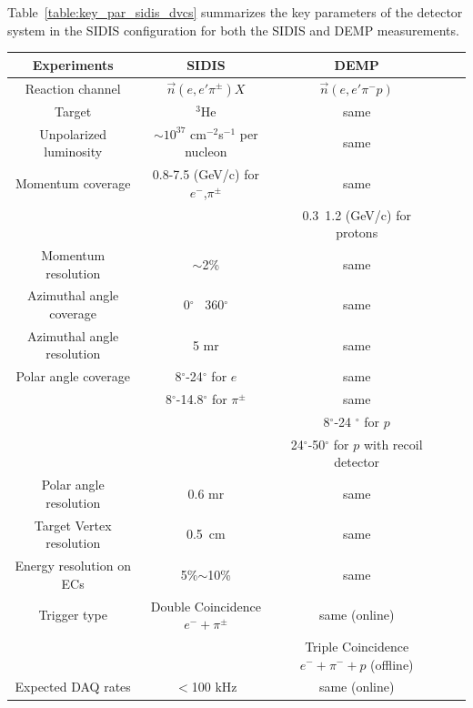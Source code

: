 Table~\ref{table:key_par_sidis_dvcs} summarizes the key parameters of the
detector system in the SIDIS configuration for both the SIDIS and DEMP
measurements.
\begin{table}\centering
\begin{tabular}{|c|c|c|c|c|}
\hline
Experiments                & SIDIS                    & DEMP  \\\hline
Reaction channel           & $\vec{n}(e,e'\pi^{\pm})X$ & $\vec{n}(e,e'\pi^{-}p)$	\\\hline
Target                     & $^3$He                   &same 	\\\hline
Unpolarized luminosity     & $\sim10^{37}$ cm$^{-2}$s$^{-1}$ per nucleon & same	\\\hline 
Momentum coverage          & 0.8-7.5 (GeV/c) for  $e^-$,$\pi^{\pm}$           &same 	\\
          										&   & 0.3~1.2 (GeV/c) for protons	\\\hline
Momentum resolution        & $\sim$2\%                & same\\\hline
Azimuthal angle coverage   & 0$^{\circ}$ ~360$^{\circ}$ & same	\\\hline
Azimuthal angle resolution & 5 mr                     & same	\\\hline
Polar angle coverage       & 8$^{\circ}$-24$^{\circ}$ for $e$ &  same \\\hline
       & 8$^{\circ}$-14.8$^{\circ}$ for $\pi^{\pm}$  &  same 	\\
                           &                          & 8$^{\circ}$-24 $^{\circ}$ for $p$ \\
                           &                          & 24$^{\circ}$-50$^{\circ}$ for $p$ with recoil detector         \\\hline
Polar angle resolution     & 0.6 mr                   & same	\\\hline
Target Vertex resolution   & 0.5~cm                   & same \\\hline
 Energy resolution on ECs  & 5\%$\sim$10\%            & same   \\\hline
Trigger type               & Double Coincidence $e^-+\pi^{\pm}$ & same (online)\\
              &  & Triple Coincidence $e^-+\pi^{-}+p$ (offline)\\\hline

Expected DAQ rates         &  $<$100 kHz              &  same (online)\\\hline


\end{tabular}
\end{table}
